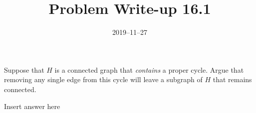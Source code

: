 \documentclass[a4paper,12pt]{article}
\title{Problem Write-up 16.1}
\date{2019–11–27}
\begin{document}
    \begin{problem}
        Suppose that \(H\) is a connected graph that \textit{contains} a proper cycle. Argue that removing any single edge from this cycle will leave a subgraph of \(H\) that remains connected.
    \end{problem}
    \begin{answer}
        Insert answer here
    \end{answer}
\end{document}
